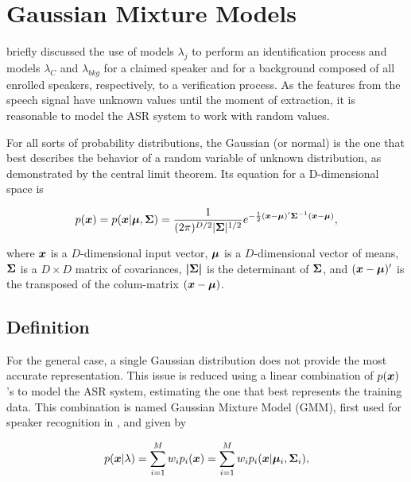 \chapter{Gaussian Mixture Models}
\label{ch:gmm}

 briefly discussed the use of models $\lambda_j$ to perform an identification process and models $\lambda_{C}$ and $\lambda_{bkg}$ for a claimed speaker and for a background composed of all enrolled speakers, respectively, to a verification process. As the features from the speech signal have unknown values until the moment of extraction, it is reasonable to model the ASR system to work with random values.

For all sorts of probability distributions, the Gaussian (or normal) is the one that best describes the behavior of a random variable of unknown distribution, as demonstrated by the central limit theorem. Its equation for a D-dimensional space is

\begin{equation}
    \pdf{\dvec{x}} = \postpdf{\dvec{x}}{\dvec{\mu},\dvec{\Sigma}} = \dgaussian{x}{\mu}{\Sigma},
    \label{eq:gaussian}
\end{equation}

\noindent where $\boldsymbol{x}$ is a $D$-dimensional input vector, $\boldsymbol{\mu}$ is a $D$-dimensional vector of means, $\boldsymbol{\Sigma}$ is a $D \times D$ matrix of covariances, $\boldsymbol{|\Sigma|}$ is the determinant of $\boldsymbol{\Sigma}$, and $(\boldsymbol{x} - \boldsymbol{\mu})'$ is the transposed of the colum-matrix $(\boldsymbol{x} - \boldsymbol{\mu})$.

\section{Definition}
\label{sec:gmm-definition}

For the general case, a single Gaussian distribution does not provide the most accurate representation. This issue is reduced using a linear combination of $p(\boldsymbol{x})$'s to model the ASR system, estimating the one that best represents the training data. This combination is named Gaussian Mixture Model (GMM), first used for speaker recognition in , and given by

\begin{equation}
    \postpdf{\dvec{x}}{\lambda} = \sum_{i=1}^M w_i\pdfi{\dvec{x}} = \sum_{i=1}^M w_i\postpdfi{\dvec{x}}{\dvec{\mu}_i, \dvec{\Sigma}_i},
    \label{eq:gaussian_mixture}
\end{equation}


